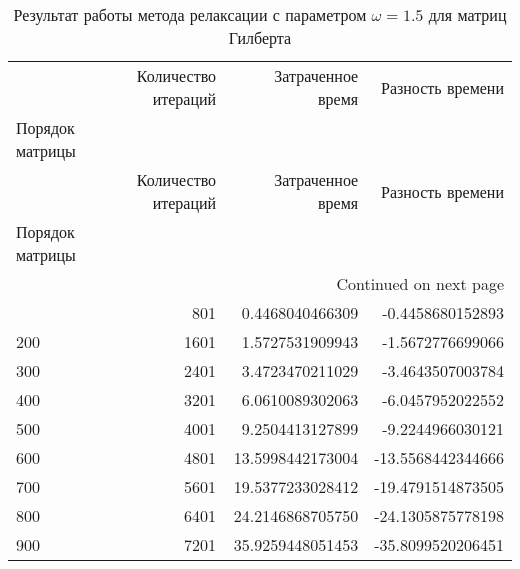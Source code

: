 \begin{longtable}{lrrr}
\caption{Результат работы метода релаксации с параметром $\omega=1.5$ для матриц Гилберта}\\
\toprule
 & Количество итераций & Затраченное время & Разность времени \\
Порядок матрицы &  &  &  \\
\midrule
\endfirsthead
\toprule
 & Количество итераций & Затраченное время & Разность времени \\
Порядок матрицы &  &  &  \\
\midrule
\endhead
\midrule
\multicolumn{4}{r}{Continued on next page} \\
\midrule
\endfoot
\bottomrule
\endlastfoot
100 & 801 & 0.4468040466309 & -0.4458680152893 \\
200 & 1601 & 1.5727531909943 & -1.5672776699066 \\
300 & 2401 & 3.4723470211029 & -3.4643507003784 \\
400 & 3201 & 6.0610089302063 & -6.0457952022552 \\
500 & 4001 & 9.2504413127899 & -9.2244966030121 \\
600 & 4801 & 13.5998442173004 & -13.5568442344666 \\
700 & 5601 & 19.5377233028412 & -19.4791514873505 \\
800 & 6401 & 24.2146868705750 & -24.1305875778198 \\
900 & 7201 & 35.9259448051453 & -35.8099520206451 \\
\end{longtable}
